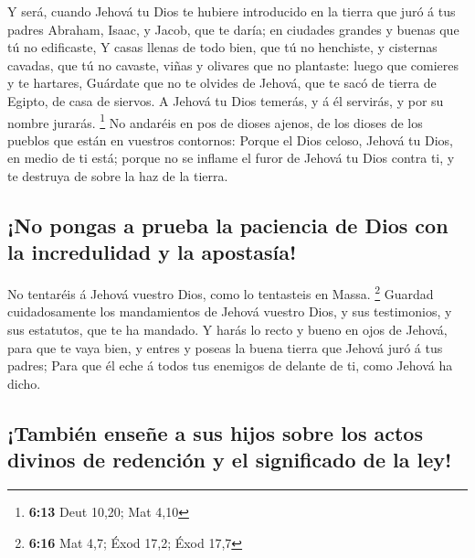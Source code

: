  Y será, cuando Jehová tu Dios te hubiere introducido en la
tierra que juró á tus padres Abraham, Isaac, y Jacob, que te daría; en
ciudades grandes y buenas que tú no edificaste,  Y casas
llenas de todo bien, que tú no henchiste, y cisternas cavadas, que tú no
cavaste, viñas y olivares que no plantaste: luego que comieres y te
hartares,  Guárdate que no te olvides de Jehová, que te
sacó de tierra de Egipto, de casa de siervos.  A Jehová tu
Dios temerás, y á él servirás, y por su nombre jurarás. \footnote{\textbf{6:13}
  Deut 10,20; Mat 4,10}  No andaréis en pos de dioses
ajenos, de los dioses de los pueblos que están en vuestros contornos:
 Porque el Dios celoso, Jehová tu Dios, en medio de ti
está; porque no se inflame el furor de Jehová tu Dios contra ti, y te
destruya de sobre la haz de la tierra.

\hypertarget{no-pongas-a-prueba-la-paciencia-de-dios-con-la-incredulidad-y-la-apostasuxeda}{%
\subsection{¡No pongas a prueba la paciencia de Dios con la incredulidad
y la
apostasía!}\label{no-pongas-a-prueba-la-paciencia-de-dios-con-la-incredulidad-y-la-apostasuxeda}}

 No tentaréis á Jehová vuestro Dios, como lo tentasteis en
Massa. \footnote{\textbf{6:16} Mat 4,7; Éxod 17,2; Éxod 17,7}
 Guardad cuidadosamente los mandamientos de Jehová vuestro
Dios, y sus testimonios, y sus estatutos, que te ha mandado.
 Y harás lo recto y bueno en ojos de Jehová, para que te
vaya bien, y entres y poseas la buena tierra que Jehová juró á tus
padres;  Para que él eche á todos tus enemigos de delante
de ti, como Jehová ha dicho.

\hypertarget{tambiuxe9n-enseuxf1e-a-sus-hijos-sobre-los-actos-divinos-de-redenciuxf3n-y-el-significado-de-la-ley}{%
\subsection{¡También enseñe a sus hijos sobre los actos divinos de
redención y el significado de la
ley!}\label{tambiuxe9n-enseuxf1e-a-sus-hijos-sobre-los-actos-divinos-de-redenciuxf3n-y-el-significado-de-la-ley}}

